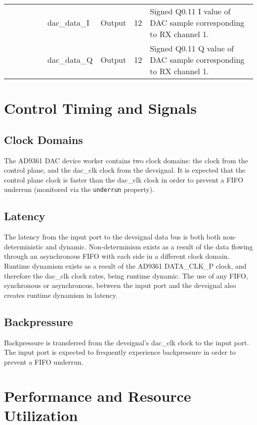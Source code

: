 \documentclass{article}
\def\devsignal{devsignal}
\def\Comp{AD9361 DAC}
\begin{document}
\begin{landscape}
\begin{scriptsize}
\begin{tabular}{|p{1.75cm}|p{2.25cm}|p{1.25cm}|p{1.25cm}|p{1.25cm}|p{3cm}|p{1.4cm}|p{0.9cm}|p{6.88cm}|}
			\cline{6-9}
			&             &        &     &      & dac\_data\_I & Output    & 12     & Signed Q0.11 I value of DAC sample corresponding to RX channel 1. \\
			\cline{6-9}
			&             &        &     &      & dac\_data\_Q & Output    & 12     & Signed Q0.11 Q value of DAC sample corresponding to RX channel 1. \\
			\hline
		\end{tabular}
	\end{scriptsize}
\end{landscape}

\section*{Control Timing and Signals}
\subsection*{Clock Domains}
The \Comp{} device worker contains two clock domains: the clock from the control plane, and the dac\_clk clock from the \devsignal{}. It is expected that the control plane clock is faster than the dac\_clk clock in order to prevent a FIFO underrun (monitored via the \verb+underrun+ property).
\subsection*{Latency}
The latency from the input port to the \devsignal{} data bus is both both non-deterministic and dynamic. Non-determinism exists as a result of the data flowing through an asynchronous FIFO with each side in a different clock domain. Runtime dynamism exists as a result of the AD9361 DATA\_CLK\_P clock, and therefore the dac\_clk clock rates, being runtime dynamic. The use of any FIFO, synchronous or asynchronous, between the input port and the \devsignal{} also creates runtime dynamism in latency.
\subsection*{Backpressure}
Backpressure is transferred from the \devsignal{}'s dac\_clk clock to the input port. The input port is expected to frequently experience backpressure in order to prevent a FIFO underrun.

\section*{Performance and Resource Utilization}
\end{document}
